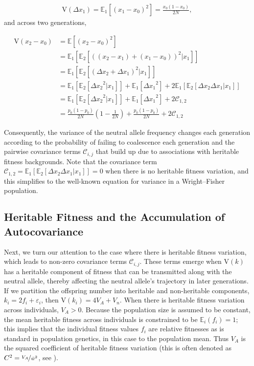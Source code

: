 \documentclass[11pt]{article}
\newcommand{\E}{\mathbb{E}}
\newcommand{\V}{\text{V}}
\begin{document}
\begin{align}
  \V(\Delta x_1) = \E_1\left[(x_1 - x_0)^2\right]= \frac{x_0(1-x_0)}{2N},
\end{align}
%
and across two generations,

\begin{align}
  \label{eq:var_wf}
  \V(x_2 - x_0) &= \E\left[(x_2 - x_0)^2\right] \nonumber \\
          &= \E_1\left[\E_2\left[((x_2-x_1) + (x_1 - x_0))^2 | x_1\right]\right] \nonumber \\
          &= \E_1\left[\E_2\left[(\Delta x_2 + \Delta x_1)^2 | x_1\right]\right] \nonumber \\
          &= \E_1\left[\E_2\left[{\Delta x_2}^2|x_1\right]\right] + \E_1\left[ {\Delta x_1}^2\right] + 2\E_1\left[\E_2[\Delta x_2 \Delta x_1 | x_1]\right] \nonumber \\
          &= \E_1\left[\E_2\left[{\Delta x_2}^2|x_1\right]\right] + \E_1\left[ {\Delta x_1}^2\right] + 2\mathcal{C}_{1,2} \nonumber \\
          &= \frac{p_0(1-p_0)}{2N}\left(1 - \frac{1}{2N}\right) + \frac{p_0(1-p_0)}{2N} + 2\mathcal{C}_{1,2}
\end{align}

Consequently, the variance of the neutral allele frequency changes each
generation according to the probability of failing to coalescence each
generation and the pairwise covariance terms $\mathcal{C}_{i,j}$ that build up
due to associations with heritable fitness backgrounds. Note that the
covariance term $\mathcal{C}_{1,2} = \E_1\left[\E_2[\Delta x_2 \Delta x_1 |
x_1]\right] = 0$ when there is no heritable fitness variation, and this
simplifies to the well-known equation for variance in a Wright--Fisher
population.

\subsection{Heritable Fitness and the Accumulation of Autocovariance}
\label{supp:heritable-fitness}

Next, we turn our attention to the case where there is heritable fitness
variation, which leads to non-zero covariance terms $\mathcal{C}_{i,j}$. These
terms emerge when $\V(k)$ has a heritable component of fitness that can be
transmitted along with the neutral allele, thereby affecting the neutral
allele's trajectory in later generations. If we partition the offspring number
into heritable and non-heritable components, $k_i = 2f_i + \varepsilon_i$, then
$\V(k_i) = 4 V_A + V_n$. When there is heritable fitness variation across
individuals, $V_A > 0$. Because the population size is assumed to be constant,
the mean heritable fitness across individuals is constrained to be $\E_i(f_i) =
1$; this implies that the individual fitness values $f_i$ are relative
fitnesses as is standard in population genetics, in this case to the population
mean. Thus $V_A$ is the squared coefficient of heritable fitness variation
(this is often denoted as $C^2 = \nicefrac{V_A}{\bar{w}^2}$, see
\cite{Crow1958-pc,Charlesworth1987-ab,Houle1992-ur}).
\end{document}
